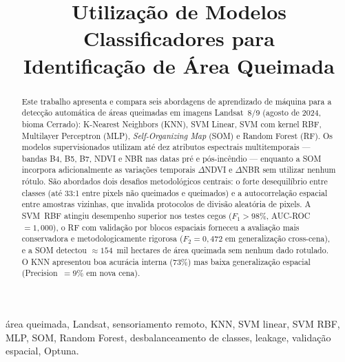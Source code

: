 \documentclass[conference]{IEEEtran}
\begin{document}
\title{Utilização de Modelos Classificadores para\\
Identificação de Área Queimada}

\author{
}

\maketitle

\begin{abstract}
Este trabalho apresenta e compara seis abordagens de aprendizado de
máquina para a detecção automática de áreas queimadas em imagens
Landsat~8/9 (agosto de 2024, bioma Cerrado): K-Nearest Neighbors (KNN),
SVM Linear, SVM com kernel RBF, Multilayer Perceptron (MLP),
\textit{Self-Organizing Map} (SOM) e Random Forest (RF). Os modelos
supervisionados utilizam até dez atributos espectrais multitemporais —
bandas B4, B5, B7, NDVI e NBR nas datas pré e pós-incêndio — enquanto
a SOM incorpora adicionalmente as variações temporais $\Delta$NDVI e
$\Delta$NBR sem utilizar nenhum rótulo.
São abordados dois desafios metodológicos centrais: o forte desequilíbrio
entre classes (até 33:1 entre pixels não queimados e queimados) e a
autocorrelação espacial entre amostras vizinhas, que invalida protocolos
de divisão aleatória de pixels. A SVM~RBF atingiu desempenho superior
nos testes cegos ($F_1 > 98\%$, AUC-ROC~$= 1{,}000$), o RF com validação
por blocos espaciais forneceu a avaliação mais conservadora e
metodologicamente rigorosa ($F_2 = 0{,}472$ em generalização cross-cena),
e a SOM detectou $\approx154$~mil hectares de área queimada sem nenhum
dado rotulado. O KNN apresentou boa acurácia interna (73\%) mas baixa
generalização espacial (Precision~$= 9\%$ em nova cena).
\end{abstract}

\begin{IEEEkeywords}
área queimada, Landsat, sensoriamento remoto, KNN, SVM linear, SVM RBF,
MLP, SOM, Random Forest, desbalanceamento de classes, leakage,
validação espacial, Optuna.
\end{IEEEkeywords}
\end{document}
